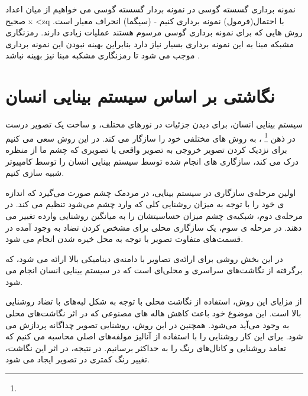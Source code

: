 
نمونه برداری گسسته گوسی 
در نمونه بردار گسسته گوسی می خواهیم از میان اعداد صحیح  x <zq با احتمال(فرمول) نمونه برداری کنیم - (سیگما) انحراف معیار است. روش هایی که برای نمونه برداری گوسی مرسوم هستند عملیات زیادی دارند.  رمزنگاری مشبکه مبنا به  این نمونه برداری بسیار نیاز دارد بنابراین بهینه نبودن این نمونه برداری موجب می شود تا رمزنگاری مشکبه مبنا نیز بهینه نباشد . 

\section{نگاشتی بر اساس سیستم بینایی انسان}
سیستم بینایی انسان، برای دیدن جزئیات در نورهای مختلف، و ساخت یک تصویر درست در ذهن
\footnote{}
، به روش های مختلفی خود را سازگار می کند.
 در این روش سعی می کنیم برای نزدیک کردن تصویر خروجی به تصویر واقعی یا تصویری که چشم ما از منظره درک می کند، سازگاری های انجام شده توسط سیستم بینایی انسان را توسط کامپیوتر شبیه سازی کنیم. 
 
 اولین مرحله‌ی سازگاری در سیستم بینایی، در مردمک چشم صورت می‌گیرد که اندازه ی خود را با توجه به میزان روشنایی کلی که وارد چشم می‌شود تنظیم می کند. در مرحله‌ی دوم، شبکیه‌ی چشم میزان حساسیتشان را به میانگین روشنایی وارده تغییر می دهند. در مرحله ی سوم، یک سازگاری محلی برای مشخص کردن تضاد به وجود آمده در قسمت‌های متفاوت تصویر با توجه به محل خیره شدن انجام می شود.
 
در این بخش روشی برای ارائه‌ی تصاویر با دامنه‌ی دینامیکی بالا ارائه می شود، که برگرفته از نگاشت‌های سراسری و محلی‌ای است که در سیستم بینایی انسان انجام می شود. 

از مزایای این روش، استفاده از نگاشت محلی با توجه به شکل لبه‌های با تضاد روشنایی بالا است. این موضوع خود باعث کاهش هاله های مصنوعی که در اثر نگاشت‌های محلی به وجود می‌آید می‌شود.
همچنین در این روش،  روشنایی تصویر  چداگانه پردازش می شود. برای این کار روشنایی را با استفاده از آنالیز مولفه‌های اصلی محاسبه می کنیم که تعامد روشنایی و کانال‌های رنگ را به حداکثر برسانیم. در نتیجه، در اثر این نگاشت، تغییر رنگ کمتری در تصویر ایجاد می شود.

